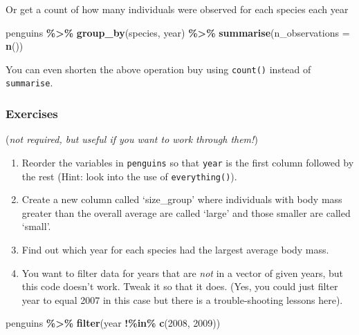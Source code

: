 \documentclass[
]{book}
\newenvironment{Shaded}{\begin{snugshade}}{\end{snugshade}}
\newcommand{\AttributeTok}[1]{\textcolor[rgb]{0.13,0.29,0.53}{#1}}
\newcommand{\DecValTok}[1]{\textcolor[rgb]{0.00,0.00,0.81}{#1}}
\newcommand{\FunctionTok}[1]{\textcolor[rgb]{0.13,0.29,0.53}{\textbf{#1}}}
\newcommand{\NormalTok}[1]{#1}
\newcommand{\SpecialCharTok}[1]{\textcolor[rgb]{0.81,0.36,0.00}{\textbf{#1}}}
\begin{document}
Or get a count of how many individuals were observed for each species each year

\begin{Shaded}
\begin{Highlighting}[]
\NormalTok{penguins }\SpecialCharTok{\%\textgreater{}\%} 
  \FunctionTok{group\_by}\NormalTok{(species, year) }\SpecialCharTok{\%\textgreater{}\%} 
  \FunctionTok{summarise}\NormalTok{(}\AttributeTok{n\_observations =} \FunctionTok{n}\NormalTok{())}
\end{Highlighting}
\end{Shaded}

You can even shorten the above operation buy using \texttt{count()} instead of \texttt{summarise}.

\hypertarget{exercises-1}{%
\subsubsection{Exercises}\label{exercises-1}}

(\emph{not required, but useful if you want to work through them!})

\begin{enumerate}
\def\labelenumi{\arabic{enumi}.}
\item
  Reorder the variables in \texttt{penguins} so that \texttt{year} is the first column followed by the rest (Hint: look into the use of \texttt{everything()}).
\item
  Create a new column called `size\_group' where individuals with body mass greater than the overall average are called `large' and those smaller are called `small'.
\item
  Find out which year for each species had the largest average body mass.
\item
  You want to filter data for years that are \emph{not} in a vector of given years, but this code doesn't work. Tweak it so that it does. (Yes, you could just filter year to equal 2007 in this case but there is a trouble-shooting lessons here).
\end{enumerate}

\begin{Shaded}
\begin{Highlighting}[]
\NormalTok{    penguins }\SpecialCharTok{\%\textgreater{}\%} 
      \FunctionTok{filter}\NormalTok{(year }\SpecialCharTok{!\%in\%} \FunctionTok{c}\NormalTok{(}\DecValTok{2008}\NormalTok{, }\DecValTok{2009}\NormalTok{))}
\end{Highlighting}
\end{Shaded}
\end{document}
